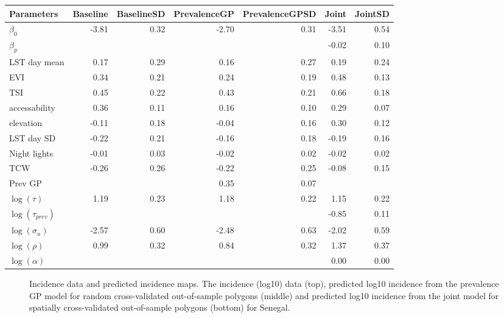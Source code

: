 \documentclass[10pt,a4]{article}
\begin{document}
\begin{table}[ht]
\centering
\begin{tabular}{lrrrrrr}
  \hline
Parameters & Baseline & BaselineSD & PrevalenceGP & PrevalenceGPSD & Joint & JointSD \\ 
  \hline
$\beta_0$ & -3.81 & 0.32 & -2.70 & 0.31 & -3.51 & 0.54 \\ 
  $\beta_p$ &  &  &  &  & -0.02 & 0.10 \\ 
  LST day mean & 0.17 & 0.29 & 0.16 & 0.27 & 0.19 & 0.24 \\ 
  EVI & 0.34 & 0.21 & 0.24 & 0.19 & 0.48 & 0.13 \\ 
  TSI & 0.45 & 0.22 & 0.43 & 0.21 & 0.66 & 0.18 \\ 
  accessability & 0.36 & 0.11 & 0.16 & 0.10 & 0.29 & 0.07 \\ 
  elevation & -0.11 & 0.18 & -0.04 & 0.16 & 0.30 & 0.12 \\ 
  LST day SD & -0.22 & 0.21 & -0.16 & 0.18 & -0.19 & 0.16 \\ 
  Night lights & -0.01 & 0.03 & -0.02 & 0.02 & -0.02 & 0.02 \\ 
  TCW & -0.26 & 0.26 & -0.22 & 0.25 & -0.08 & 0.15 \\ 
  Prev GP &  &  & 0.35 & 0.07 &  &  \\ 
  $\log(\tau)$ & 1.19 & 0.23 & 1.18 & 0.22 & 1.15 & 0.22 \\ 
  $\log(\tau_{prev})$ &  &  &  &  & -0.85 & 0.11 \\ 
  $\log(\sigma_u)$ & -2.57 & 0.60 & -2.48 & 0.63 & -2.02 & 0.59 \\ 
  $\log(\rho)$ & 0.99 & 0.32 & 0.84 & 0.32 & 1.37 & 0.37 \\ 
  $\log(\alpha)$ &  &  &  &  & 0.00 & 0.00 \\ 
   \hline
\end{tabular}
\end{table}


\begin{figure}[h!]
\caption{\label{predobsmapsen}
Incidence data and predicted incidence maps.
The incidence (log10) data (top), predicted log10 incidence from the prevalence GP model for random cross-validated out-of-sample polygons (middle) and predicted log10 incidence from the joint model for spatially cross-validated out-of-sample polygons (bottom) for Senegal.
}
\end{figure}
\end{document}
